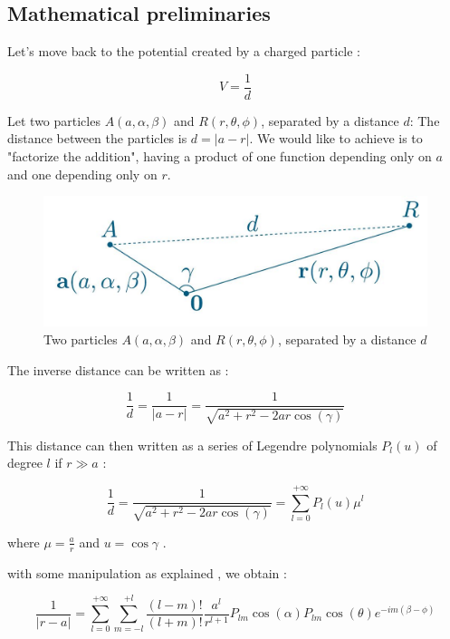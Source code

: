 \documentclass[11pt,twoside,a4paper]{report}
\begin{document}
	\subsection{Mathematical preliminaries}
	
	Let's move back to the potential created by a charged particle :
	
	\begin{equation*}
	V = \frac{1}{d}
	\end{equation*}
	
	Let two particles $A(a,\alpha,\beta)$ and $R(r,\theta,\phi)$, separated by a distance $d$: The distance between the particles is $d = |a - r|$.
	We would like to achieve is to "factorize the addition", having a product of one function depending only on $a$ and one depending only on $r$.
	
	
\begin{figure}[H]
\includegraphics[scale=0.4]{distance}
 \centering 
\caption{Two particles $A(a,\alpha,\beta)$ and $R(r,\theta,\phi)$, separated by a distance $d$}
\label{fig:poster}
\end{figure}	
	
	
	The inverse distance can be written as :
	
	\begin{equation*}
		\frac{1}{d} = \frac{1}{|a-r|} = \frac{1}{\sqrt{a^2 + r^2 - 2ar \cos(\gamma)}}
	\end{equation*}

	This distance can then written as a series of Legendre polynomials  $P_l(u)$ of degree $l$ if $r \gg a$ :
	
	\begin{equation}
		\frac{1}{d} = \frac{1}{\sqrt{a^2 + r^2 - 2ar \cos(\gamma)}} = \sum\limits_{l=0}^{+\infty} P_l(u)\mu^l
	\end{equation}
	
	
	where $\mu = \frac{a}{r}$ and $u = \cos{\gamma}$ .
	
	with some manipulation as explained \cite{phdIvo} , we obtain : 
	
	\begin{equation}
	\frac{1}{|r - a|} = \sum\limits_{l=0}^{+\infty} \sum\limits_{m = -l}^{+l} \frac{(l-m)!}{(l+m)!} \frac{a^l}{r^{l+1}} P_{lm}\cos{(\alpha)}P_{lm}\cos{(\theta)}e^{-im(\beta - \phi)}
	\end{equation}
	
\end{document}
